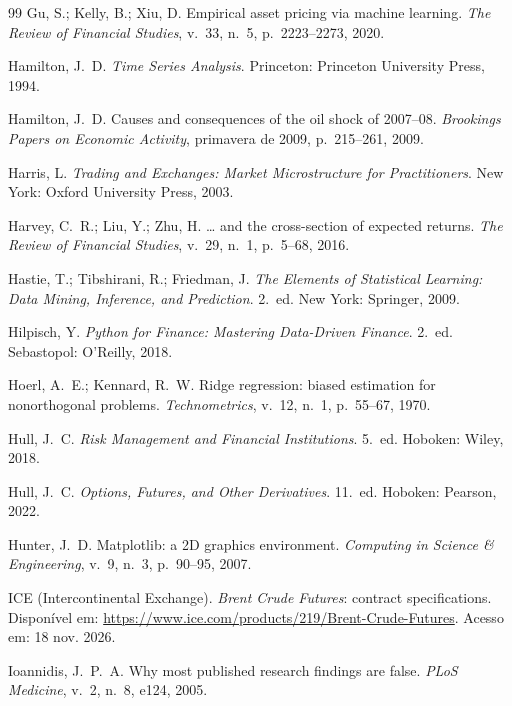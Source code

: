 \begin{thebibliography}{99}
Gu, S.; Kelly, B.; Xiu, D. Empirical asset pricing via machine learning. \emph{The Review of Financial Studies}, v.~33, n.~5, p.~2223--2273, 2020.

Hamilton, J.~D. \emph{Time Series Analysis}. Princeton: Princeton University Press, 1994.

Hamilton, J.~D. Causes and consequences of the oil shock of 2007--08. \emph{Brookings Papers on Economic Activity}, primavera de 2009, p.~215--261, 2009.

Harris, L. \emph{Trading and Exchanges: Market Microstructure for Practitioners}. New York: Oxford University Press, 2003.

Harvey, C.~R.; Liu, Y.; Zhu, H. \ldots{} and the cross-section of expected returns. \emph{The Review of Financial Studies}, v.~29, n.~1, p.~5--68, 2016.

Hastie, T.; Tibshirani, R.; Friedman, J. \emph{The Elements of Statistical Learning: Data Mining, Inference, and Prediction}. 2.~ed. New York: Springer, 2009.

Hilpisch, Y. \emph{Python for Finance: Mastering Data-Driven Finance}. 2.~ed. Sebastopol: O'Reilly, 2018.

Hoerl, A.~E.; Kennard, R.~W. Ridge regression: biased estimation for nonorthogonal problems. \emph{Technometrics}, v.~12, n.~1, p.~55--67, 1970.

Hull, J.~C. \emph{Risk Management and Financial Institutions}. 5.~ed. Hoboken: Wiley, 2018.

Hull, J.~C. \emph{Options, Futures, and Other Derivatives}. 11.~ed. Hoboken: Pearson, 2022.

Hunter, J.~D. Matplotlib: a 2D graphics environment. \emph{Computing in Science \& Engineering}, v.~9, n.~3, p.~90--95, 2007.

ICE (Intercontinental Exchange). \emph{Brent Crude Futures}: contract specifications. Disponível em: \url{https://www.ice.com/products/219/Brent-Crude-Futures}. Acesso em: 18 nov. 2026.

Ioannidis, J.~P.~A. Why most published research findings are false. \emph{PLoS Medicine}, v.~2, n.~8, e124, 2005.


\end{thebibliography}
